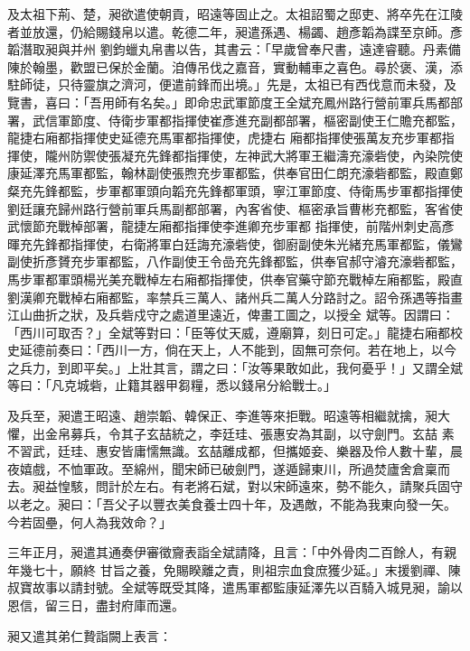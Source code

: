 \begin{pinyinscope}
 及太祖下荊、楚，昶欲遣使朝貢，昭遠等固止之。太祖詔蜀之邸吏、將卒先在江陵者並放還，仍給賜錢帛以遣。乾德二年，昶遣孫遇、楊蠲、趙彥韜為諜至京師。彥韜潛取昶與并州
 劉鈞蠟丸帛書以告，其書云：「早歲曾奉尺書，遠達睿聽。丹素備陳於翰墨，歡盟已保於金蘭。洎傳吊伐之嘉音，實動輔車之喜色。尋於褒、漢，添駐師徒，只待靈旗之濟河，便遣前鋒而出境。」先是，太祖已有西伐意而未發，及覽書，喜曰：「吾用師有名矣。」即命忠武軍節度王全斌充鳳州路行營前軍兵馬都部署，武信軍節度、侍衛步軍都指揮使崔彥進充副都部署，樞密副使王仁贍充都監，龍捷右廂都指揮使史延德充馬軍都指揮使，虎捷右
 廂都指揮使張萬友充步軍都指揮使，隴州防禦使張凝充先鋒都指揮使，左神武大將軍王繼濤充濠砦使，內染院使康延澤充馬軍都監，翰林副使張煦充步軍都監，供奉官田仁朗充濠砦都監，殿直鄭粲充先鋒都監，步軍都軍頭向韜充先鋒都軍頭，寧江軍節度、侍衛馬步軍都指揮使劉廷讓充歸州路行營前軍兵馬副都部署，內客省使、樞密承旨曹彬充都監，客省使武懷節充戰棹部署，龍捷左廂都指揮使李進卿充步軍都
 指揮使，前階州刺史高彥暉充先鋒都指揮使，右衛將軍白廷誨充濠砦使，御廚副使朱光緒充馬軍都監，儀鸞副使折彥贇充步軍都監，八作副使王令嵒充先鋒都監，供奉官郝守濬充濠砦都監，馬步軍都軍頭楊光美充戰棹左右廂都指揮使，供奉官藥守節充戰棹左廂都監，殿直劉漢卿充戰棹右廂都監，率禁兵三萬人、諸州兵二萬人分路討之。詔令孫遇等指畫江山曲折之狀，及兵砦戍守之處道里遠近，俾畫工圖之，以授全
 斌等。因謂曰：「西川可取否？」全斌等對曰：「臣等仗天威，遵廟算，刻日可定。」龍捷右廂都校史延德前奏曰：「西川一方，倘在天上，人不能到，固無可奈何。若在地上，以今之兵力，到即平矣。」上壯其言，謂之曰：「汝等果敢如此，我何憂乎！」又謂全斌等曰：「凡克城砦，止籍其器甲芻糧，悉以錢帛分給戰士。」



 及兵至，昶遣王昭遠、趙崇韜、韓保正、李進等來拒戰。昭遠等相繼就擒，昶大懼，出金帛募兵，令其子玄喆統之，李廷珪、張惠安為其副，以守劍門。玄喆
 素不習武，廷珪、惠安皆庸懦無識。玄喆離成都，但攜姬妾、樂器及伶人數十輩，晨夜嬉戲，不恤軍政。至綿州，聞宋師已破劍門，遂遁歸東川，所過焚廬舍倉稟而去。昶益惶駭，問計於左右。有老將石斌，對以宋師遠來，勢不能久，請聚兵固守以老之。昶曰：「吾父子以豐衣美食養士四十年，及遇敵，不能為我東向發一矢。今若固壘，何人為我效命？」



 三年正月，昶遣其通奏伊審徵齎表詣全斌請降，且言：「中外骨肉二百餘人，有親年幾七十，願終
 甘旨之養，免賜睽離之責，則祖宗血食庶獲少延。」末援劉禪、陳叔寶故事以請封號。全斌等既受其降，遣馬軍都監康延澤先以百騎入城見昶，諭以恩信，留三日，盡封府庫而還。



 昶又遣其弟仁贄詣闕上表言：




\end{pinyinscope}
